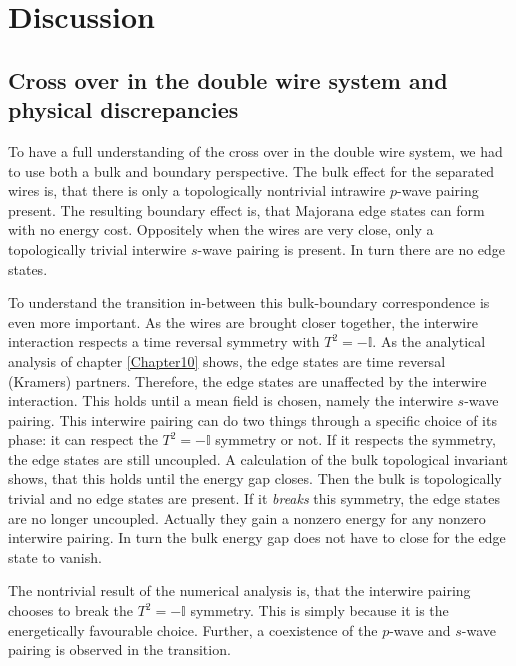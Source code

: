 \chapter{Discussion} 

\label{Chapter9} 

\section{Cross over in the double wire system and physical discrepancies} \label{sec.Discussion.2wires.crossover}
To have a full understanding of the cross over in the double wire system, we had to use both a bulk and boundary perspective. The bulk effect for the separated wires is, that there is only a topologically nontrivial intrawire $p$-wave pairing present. The resulting boundary effect is, that Majorana edge states can form with no energy cost. Oppositely when the wires are very close, only a topologically trivial interwire $s$-wave pairing is present. In turn there are no edge states. 

To understand the transition in-between this bulk-boundary correspondence is even more important. As the wires are brought closer together, the interwire interaction respects a time reversal symmetry with $T^2 = - \mathbb{I}$. As the analytical analysis of chapter \ref{Chapter10} shows, the edge states are time reversal (Kramers) partners. Therefore, the edge states are unaffected by the interwire interaction. This holds until a mean field is chosen, namely the interwire $s$-wave pairing. This interwire pairing can do two things through a specific choice of its phase: it can respect the $T^2 = - \mathbb{I}$ symmetry or not. If it respects the symmetry, the edge states are still uncoupled. A calculation of the bulk topological invariant shows, that this holds until the energy gap closes. Then the bulk is topologically trivial and no edge states are present. If it \textit{breaks} this symmetry, the edge states are no longer uncoupled. Actually they gain a nonzero energy for any nonzero interwire pairing. In turn the bulk energy gap does not have to close for the edge state to vanish. 

The nontrivial result of the numerical analysis is, that the interwire pairing chooses to break the $T^2 = -\mathbb{I}$ symmetry. This is simply because it is the energetically favourable choice. Further, a coexistence of the $p$-wave and $s$-wave pairing is observed in the transition. 

